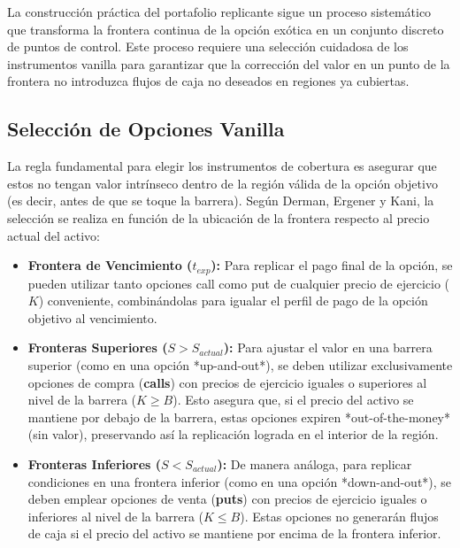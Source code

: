 La construcción práctica del portafolio replicante sigue un proceso sistemático que transforma la frontera continua de la opción exótica en un conjunto discreto de puntos de control. Este proceso requiere una selección cuidadosa de los instrumentos vanilla para garantizar que la corrección del valor en un punto de la frontera no introduzca flujos de caja no deseados en regiones ya cubiertas.

\subsection{Selección de Opciones Vanilla}

La regla fundamental para elegir los instrumentos de cobertura es asegurar que estos no tengan valor intrínseco dentro de la región válida de la opción objetivo (es decir, antes de que se toque la barrera). Según Derman, Ergener y Kani, la selección se realiza en función de la ubicación de la frontera respecto al precio actual del activo:

\begin{itemize} 
  \item \textbf{Frontera de Vencimiento ($t_{exp}$):} Para replicar el pago final de la opción, se pueden utilizar tanto opciones call como put de cualquier precio de ejercicio ($K$) conveniente, combinándolas para igualar el perfil de pago de la opción objetivo al vencimiento.

  \item \textbf{Fronteras Superiores ($S > S_{actual}$):} Para ajustar el valor en una barrera superior (como en una opción *up-and-out*), se deben utilizar exclusivamente opciones de compra (\textbf{calls}) con precios de ejercicio iguales o superiores al nivel de la barrera ($K \geq B$). Esto asegura que, si el precio del activo se mantiene por debajo de la barrera, estas opciones expiren *out-of-the-money* (sin valor), preservando así la replicación lograda en el interior de la región.

  \item \textbf{Fronteras Inferiores ($S < S_{actual}$):} De manera análoga, para replicar condiciones en una frontera inferior (como en una opción *down-and-out*), se deben emplear opciones de venta (\textbf{puts}) con precios de ejercicio iguales o inferiores al nivel de la barrera ($K \leq B$). Estas opciones no generarán flujos de caja si el precio del activo se mantiene por encima de la frontera inferior.
\end{itemize}

